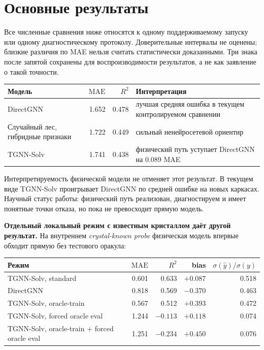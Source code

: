 \documentclass[11pt]{article}
\newcommand{\mae}{\mathrm{MAE}}
\newcommand{\Rtwo}{R^2}
\theoremstyle{definition}
\begin{document}
\section{Основные результаты}

Все численные сравнения ниже относятся к одному поддерживаемому запуску или одному диагностическому протоколу. Доверительные интервалы не оценены; близкие различия по MAE нельзя считать статистически доказанными. Три знака после запятой сохранены для воспроизводимости результатов, а не как заявление о такой точности.

\begin{center}
\small
\begin{tabularx}{\textwidth}{P{0.30\textwidth}rrY}
\toprule
Модель & $\mae$ & $\Rtwo$ & Интерпретация \\
\midrule
DirectGNN & 1.652 & 0.478 & лучшая средняя ошибка в текущем контролируемом сравнении \\
Случайный лес, гибридные признаки & 1.722 & 0.449 & сильный ненейросетевой ориентир \\
TGNN-Solv & 1.741 & 0.438 & физический путь уступает DirectGNN на $0.089$ MAE \\
\bottomrule
\end{tabularx}
\end{center}

Интерпретируемость физической модели не отменяет этот результат. В текущем виде TGNN-Solv проигрывает DirectGNN по средней ошибке на новых каркасах. Научный статус работы: физический путь реализован, диагностируем и имеет понятные точки отказа, но пока не превосходит прямую модель.

\textbf{Отдельный локальный режим с известным кристаллом даёт другой результат.} На внутреннем \emph{crystal-known probe} физическая модель впервые обходит прямую без тестового оракула:
\begin{center}
\small
\begin{tabular}{lrrrr}
\toprule
Режим & $\mae$ & $\Rtwo$ & bias & $\sigma(\hat y)/\sigma(y)$ \\
\midrule
TGNN-Solv, standard & 0.601 & 0.633 & $+0.087$ & 0.518 \\
DirectGNN & 0.818 & 0.569 & $-0.370$ & 0.463 \\
TGNN-Solv, oracle-train & 0.567 & 0.512 & $+0.393$ & 0.472 \\
TGNN-Solv, forced oracle eval & 1.244 & $-0.113$ & $+0.118$ & 0.074 \\
TGNN-Solv, oracle-train + forced oracle eval & 1.251 & $-0.234$ & $+0.450$ & 0.076 \\
\bottomrule
\end{tabular}
\end{center}
\end{document}

